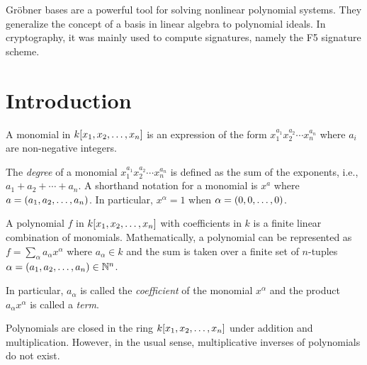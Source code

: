 \documentclass[twoside]{article}
\begin{document}



Gr\"{o}bner bases are a powerful tool for solving nonlinear polynomial systems.
They generalize the concept of a basis in linear algebra to polynomial ideals.
In cryptography, it was mainly used to compute signatures, namely the F5
signature scheme.

\section{Introduction}
\label{sec:intro}

\begin{definition}[Monomial]
    A monomial in \(k[x_1, x_2, \ldots, x_n]\) is an expression of the
    form \(x_1^{a_1} x_2^{a_2} \cdots x_n^{a_n}\) where \(a_i\) are non-negative
    integers.
\end{definition}
The \emph{degree} of a monomial \(x_1^{a_1} x_2^{a_2} \cdots x_n^{a_n}\) is
defined as the sum of the exponents, i.e., \(a_1 + a_2 + \cdots + a_n\). A
shorthand notation for a monomial is \(x^a\) where \(a = (a_1, a_2, \ldots,
a_n)\). In particular, \(x^{\alpha} = 1\) when \(\alpha = (0, 0, \ldots,
0)\).

\begin{definition}[Polynomial]
    A polynomial \(f\) in \(k[x_1, x_2, \ldots, x_n]\) with coefficients
    in \(k\) is a finite linear combination of monomials. Mathematically, a
    polynomial can be represented as \(f = \sum_{\alpha} a_{\alpha} x^{\alpha}\)
    where \(a_{\alpha} \in k\) and the sum is taken over a finite set of
    \(n\)-tuples \(\alpha = (a_1, a_2, \ldots, a_n) \in \mathbb N^n\).
\end{definition}
In particular, \(a_{\alpha}\) is called the \emph{coefficient} of the monomial
\(x^{\alpha}\) and the product \(a_{\alpha} x^{\alpha}\) is called a
\emph{term}.

Polynomials are closed in the ring \(k[x_1, x_2, \ldots, x_n]\) under
addition and multiplication. However, in the usual sense, multiplicative
inverses of polynomials do not exist.
\end{document}
